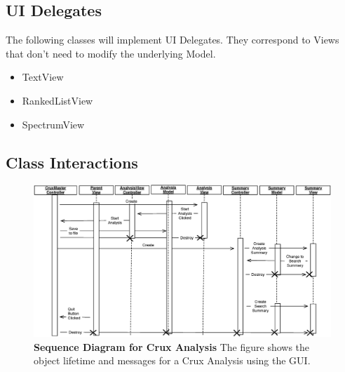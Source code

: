 \documentclass{article}
\begin{document}
\subsection{UI Delegates}

The following classes will implement UI Delegates. They correspond to Views
that don't need to modify the underlying Model.

\begin{itemize}
\item TextView 
\item RankedListView
\item SpectrumView
\end{itemize}

\subsection{Class Interactions}

\begin{figure}[h]
\centering
\includegraphics[width=6in]{crux-gui-sequence.eps}
\caption{{\bf Sequence Diagram for Crux Analysis}  The figure shows the 
object lifetime and messages for a Crux Analysis using the GUI.
  \label{figure:sequence}}
\end{figure}
\end{document}
